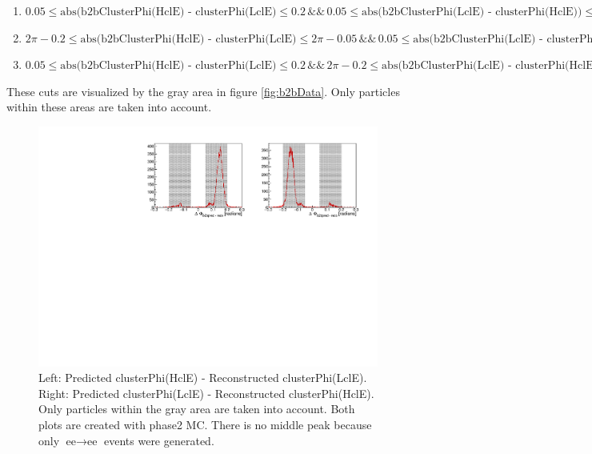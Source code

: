 \documentclass[a4paper,11pt,twosided,final,german,openbib,pdftex,listof=totoc,bibliography=totoc]{scrbook}
\begin{document}
\begin{enumerate}[label=(\alph*)]
	\item $0.05 \leq \textrm{abs(b2bClusterPhi(HclE) - clusterPhi(LclE)} \leq 0.2 \, \&\& \, 0.05 \leq \textrm{abs(b2bClusterPhi(LclE) - clusterPhi(HclE))} \leq 0.2$
	\item $2\pi - 0.2 \leq \textrm{abs(b2bClusterPhi(HclE) - clusterPhi(LclE)} \leq 2\pi - 0.05 \, \&\& \, 0.05 \leq \textrm{abs(b2bClusterPhi(LclE) - clusterPhi(HclE))} \leq 0.2$
	\item $0.05 \leq \textrm{abs(b2bClusterPhi(HclE) - clusterPhi(LclE)} \leq 0.2 \, \&\& \, 2\pi - 0.2 \leq \textrm{abs(b2bClusterPhi(LclE) - clusterPhi(HclE))} \leq 2\pi - 0.05$
\end{enumerate}

These cuts are visualized by the gray area in figure \ref{fig:b2bData}. Only particles within these areas are taken into account.




\begin{figure}[h!]
	\centering
	\includegraphics[width=\textwidth]{Plots/master/sb2b_MC.pdf}
	\caption[b2bClusterPhi - clusterPhi For MC]{Left: Predicted clusterPhi(HclE) - Reconstructed clusterPhi(LclE). Right: Predicted clusterPhi(LclE) - Reconstructed clusterPhi(HclE). Only particles within the gray area are taken into account. Both plots are created with phase2 MC. There is no middle peak because only $\textrm{ee} \rightarrow \textrm{ee}$ events were generated.}
	\label{fig:b2bMC}
\end{figure}
\end{document}

